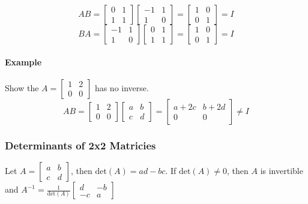 \[AB = \begin{bmatrix}
    0 & 1 \\
    1 & 1
\end{bmatrix} \begin{bmatrix}
    -1 & 1 \\
    1 & 0
\end{bmatrix} = \begin{bmatrix}
    1 & 0 \\
    0 & 1
\end{bmatrix} = I\]
\[BA = \begin{bmatrix}
    -1 & 1 \\
    1 & 0
\end{bmatrix} \begin{bmatrix}
    0 & 1 \\
    1 & 1
\end{bmatrix} = \begin{bmatrix}
    1 & 0 \\
    0 & 1
\end{bmatrix} = I\]

\paragraph*{Example} 
Show the $A = \begin{bmatrix}
    1 & 2 \\
    0 & 0
\end{bmatrix}$ has no inverse.
\[AB = \begin{bmatrix}
    1 & 2 \\
    0 & 0
\end{bmatrix} \begin{bmatrix}
    a & b \\
    c & d
\end{bmatrix} = \begin{bmatrix}
    a + 2c & b + 2d \\
    0 & 0
\end{bmatrix} \neq I\]

\subsubsection*{Determinants of 2x2 Matricies}
Let $A = \begin{bmatrix}
a & b \\
c & d
\end{bmatrix}$, then $\text{det}(A) = ad - bc$. If $\text{det}(A) \neq 0$, then $A$ is invertible and $A^{-1} = \frac{1}{\text{det}(A)} \begin{bmatrix}
d & -b \\
-c & a
\end{bmatrix}$

